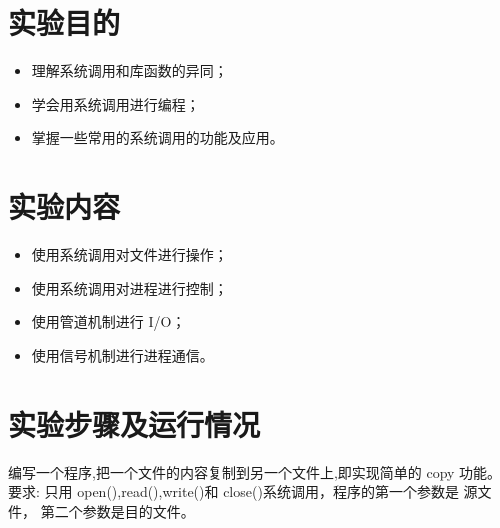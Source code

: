 \documentclass{JNUexp}
\begin{document}
 

\section{实验目的}
\begin{itemize}
    \item 理解系统调用和库函数的异同；
    \item 学会用系统调用进行编程；
    \item 掌握一些常用的系统调用的功能及应用。
\end{itemize}

\section{实验内容}
\begin{itemize}
    \item 使用系统调用对文件进行操作；
    \item 使用系统调用对进程进行控制；
    \item 使用管道机制进行 I/O；
    \item 使用信号机制进行进程通信。
\end{itemize}
\section{实验步骤及运行情况}
\begin{problem}
    编写一个程序,把一个文件的内容复制到另一个文件上,即实现简单的 copy 功能。要求:
    只用 open(),read(),write()和 close()系统调用，程序的第一个参数是 源文件，
    第二个参数是目的文件。
\end{problem}

\begin{answer}
    下面是程序的源代码：
    C++}]{../src/copy/main.cpp}
\end{answer}
\end{document}
